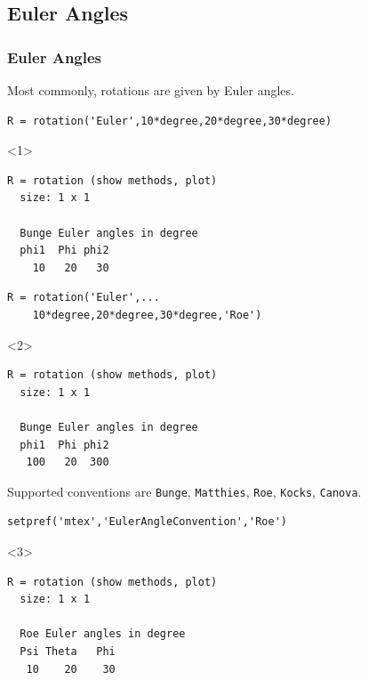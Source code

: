 \subsection*{Euler Angles}
\label{sec:euler-angles}

\begin{frame}[fragile]
  \frametitle{Euler Angles}

  Most commonly, rotations are given by Euler angles.

  \begin{lstlisting}
R = rotation('Euler',10*degree,20*degree,30*degree)
  \end{lstlisting}
  \begin{onlyenv}<1>
  \begin{lstlisting}[style=output]
R = rotation (show methods, plot)
  size: 1 x 1

  Bunge Euler angles in degree
  phi1  Phi phi2
    10   20   30
  \end{lstlisting}
  \end{onlyenv}

  \pause

  \begin{lstlisting}
R = rotation('Euler',...
    10*degree,20*degree,30*degree,'Roe')
  \end{lstlisting}
  \begin{onlyenv}<2>
  \begin{lstlisting}[style=output]
R = rotation (show methods, plot)
  size: 1 x 1

  Bunge Euler angles in degree
  phi1  Phi phi2
   100   20  300
  \end{lstlisting}
\end{onlyenv}

\pause

Supported conventions are \texttt{Bunge}, \texttt{Matthies}, \texttt{Roe},
\texttt{Kocks}, \texttt{Canova}.
  \begin{lstlisting}
setpref('mtex','EulerAngleConvention','Roe')
  \end{lstlisting}

  \begin{onlyenv}<3>
  \begin{lstlisting}[style=output]
R = rotation (show methods, plot)
  size: 1 x 1

  Roe Euler angles in degree
  Psi Theta   Phi
   10    20    30
 \end{lstlisting}
\end{onlyenv}
\end{frame}

